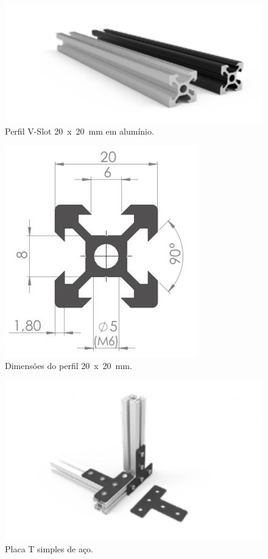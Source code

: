 \begin{figure}[H]
\centering
\caption{Perfil V-Slot 20~x~20~mm em alumínio.}\label{fig:p20x20p}
\includegraphics[scale = 0.6]{figuras/p20x20p}
\end{figure}
    
\begin{figure}[H]
\centering
\caption{Dimensões do perfil 20~x~20~mm.}\label{fig:p20x20d}
\includegraphics[scale = 1]{figuras/p20x20d}
\end{figure}
    
\begin{figure}[H]
\centering
\caption{Placa T simples de aço.}\label{fig:placatp}
\includegraphics[scale = 0.4]{figuras/placatp}
\end{figure}
    
